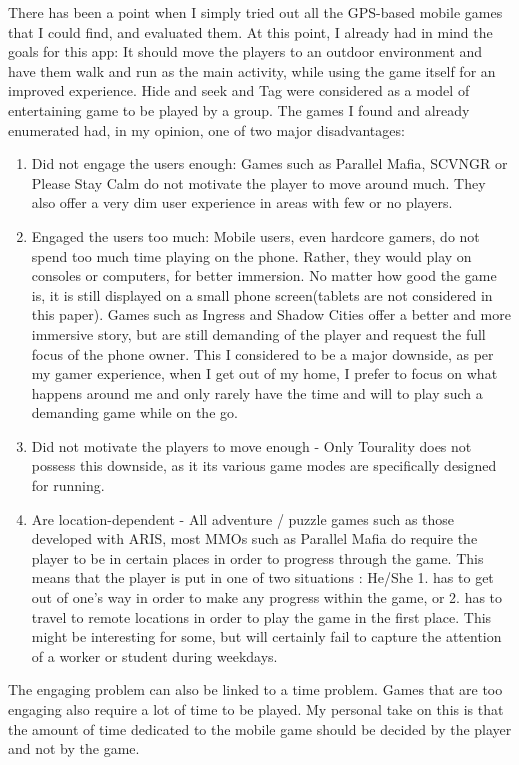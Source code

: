 \documentclass{article}
\begin{document}
There has been a point when I simply tried out all the GPS-based mobile games
that I could find, and evaluated them. At this point, I already had in mind the
goals for this app: It should move the players to an outdoor environment and
have them walk and run as the main activity, while using the game itself for
an improved experience. Hide and seek and Tag were considered as a model of
entertaining game to be played by a group. The games I found and already
enumerated had, in my opinion, one of two major disadvantages:
\begin{enumerate}
  \item Did not engage the users enough: Games such as Parallel Mafia, SCVNGR or
  Please Stay Calm do not motivate the player to move around much. They also
  offer a very dim user experience in areas with few or no players.
  \item Engaged the users too much: Mobile users, even hardcore gamers, do not
  spend too much time playing on the phone. Rather, they would play on consoles
  or computers, for better immersion. No matter how good the game is, it is
  still displayed on a small phone screen(tablets are not considered in this
  paper). Games such as Ingress and Shadow Cities offer a better and more
  immersive story, but are still demanding of the player and request the full
  focus of the phone owner. This I considered to be a major downside, as per my
  gamer experience, when I get out of my home, I prefer to focus on what happens
  around me and only rarely have the time and will to play such a demanding game
  while on the go. 
  \item Did not motivate the players to move enough - Only Tourality does not
  possess this downside, as it its various game modes are specifically designed
  for running.
  \item Are location-dependent - All adventure / puzzle games such as those
  developed with ARIS, most MMOs such as Parallel Mafia do require the player to
  be in certain places in order to progress through the game. This means that
  the player is put in one of two situations : He/She 1. has to get out of
  one's way in order to make any progress within the game, or 2. has to travel
  to remote locations in order to play the game in the first place. This might
  be interesting for some, but will certainly fail to capture the attention of a
  worker or student during weekdays.
\end{enumerate}

The engaging problem can also be linked to a time problem. Games that are too
engaging also require a lot of time to be played. My personal take on this is
that the amount of time dedicated to the mobile game should be decided by the
player and not by the game.
\end{document}
